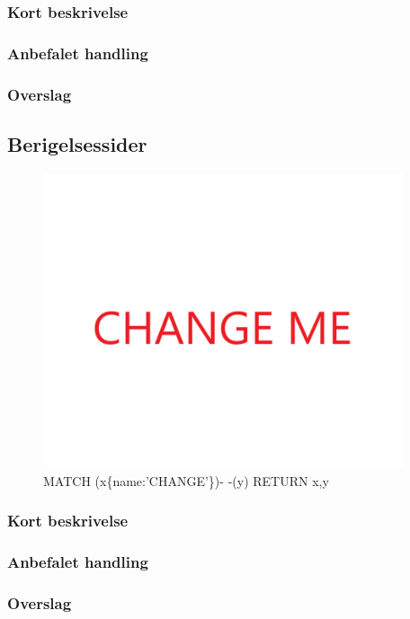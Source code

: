 \documentclass{article}
\begin{document}
\subsubsection{Kort beskrivelse}
\subsubsection{Anbefalet handling}
\subsubsection{Overslag}
\subsection{Berigelsessider}
\begin{figure}[h]
\includegraphics[width=300pt]{CHANGE.PNG}
\caption{MATCH (x\{name:'CHANGE'\})- -(y) RETURN x,y}
\end{figure}
\subsubsection{Kort beskrivelse}
\subsubsection{Anbefalet handling}
\subsubsection{Overslag}
\end{document}
